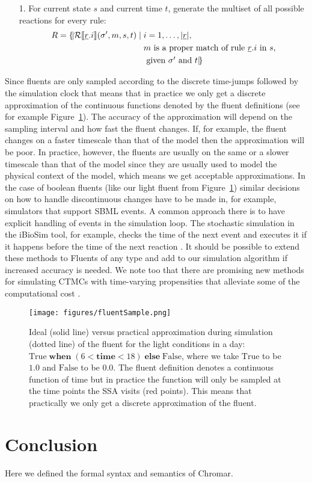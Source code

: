 \begin{itemize}
\item[1.]  For current state  $s$ and current time $t$, 
 generate the multiset of all possible reactions for every rule:
 \begin{equation*}
 \begin{split}
R  = \{\!|  \mathcal{R}\llbracket \underline{r}.i \rrbracket(\sigma', m, s, t) \; | \; & i = 1,\ldots,|\underline{r}|, \\ 
                                 & m \mbox{ is a proper match of rule $\underline{r}.i$ in $s$}, \\ 
                                 & \mbox{ given $\sigma'$ and $t$} |\!\}
\end{split}
\end{equation*}
\end{itemize}

Since fluents are only sampled according to the discrete time-jumps followed by
the simulation clock that means that in practice we only get a discrete
approximation of the continuous functions denoted by the fluent definitions (see
for example Figure~\ref{fig:fluentSamp}). The accuracy of the approximation will
depend on the sampling interval and how fast the fluent changes. If, for
example, the fluent changes on a faster timescale than that of the model then
the approximation will be poor. In practice, however, the fluents are usually on
the same or a slower timescale than that of the model since they are usually
used to model the physical context of the model, which means we get acceptable
approximations. In the case of boolean fluents (like our light fluent from
Figure~\ref{fig:fluentSamp}) similar decisions on how to handle discontinuous
changes have to be made in, for example, simulators that support SBML events. A
common approach there is to have explicit handling of events in the simulation
loop. The stochastic simulation in the iBioSim tool, for example, checks the
time of the next event and executes it if it happens before the time of the next
reaction \citep[see][Algorithm 7]{watanabe_hierarchical_2014}. It should be
possible to extend these methods to Fluents of any type and add to our
simulation algorithm if increased accuracy is needed. We note too that there are
promising new methods for simulating CTMCs with time-varying propensities that
alleviate some of the computational cost \citep{voliotis_stochastic_2016}.

\begin{figure}[tb]
\centering
\texttt{[image: figures/fluentSample.png]}
\caption{ Ideal (solid line) versus practical approximation during simulation
  (dotted line) of the fluent for the light conditions in a day:
  $ \mathrm{True} \; \mathbf{when} \; (6 < \mathbf{time} < 18) \; \mathbf{else}
  \; \mathrm{False}$, where we take $\mathrm{True}$ to be $1.0$ and
  $\mathrm{False}$ to be $0.0$. The fluent definition denotes a continuous
  function of time but in practice the function will only be sampled at the time
  points the SSA visits (red points). This means that practically we only get a
  discrete approximation of the fluent.}
\label{fig:fluentSamp}
\end{figure}

\section{Conclusion}
Here we defined the formal syntax and semantics of Chromar.


